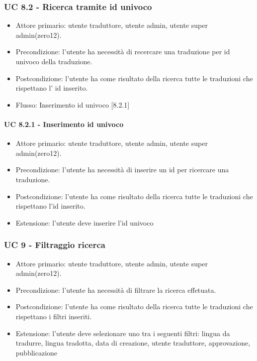     \subsubsection{UC 8.2 - Ricerca tramite id univoco}
        \begin{itemize}
            \item Attore primario: utente traduttore, utente admin, utente super admin(zero12).
            \item Precondizione: l'utente ha necessità di recercare una traduzione per id univoco della traduzione.
            \item Postcondizione: l'utente ha come risultato della ricerca tutte le traduzioni che rispettano l' id inserito.
            \item Flusso: Inserimento id univoco [8.2.1]
        \end{itemize}
        \paragraph{UC 8.2.1 - Inserimento id univoco}
            \begin{itemize}
                \item Attore primario: utente traduttore, utente admin, utente super admin(zero12).
                \item Precondizione: l'utente ha necessità di inserire un id per ricercare una traduzione.
                \item Postcondizione: l'utente ha come risultato della ricerca tutte le traduzioni che rispettano l'id inserito.
                \item Estensione: l'utente deve inserire l'id univoco
            \end{itemize}
\subsubsection{UC 9 - Filtraggio ricerca}
    \begin{itemize}
        \item Attore primario: utente traduttore, utente admin, utente super admin(zero12).
        \item Precondizione: l'utente ha necessità di filtrare la ricerca effetuata.
        \item Postcondizione: l'utente ha come risultato della ricerca tutte le traduzioni che rispettano i filtri inseriti.
        \item Estensione: l'utente deve selezionare uno tra i seguenti filtri: lingua da tradurre, lingua tradotta, data di creazione, utente traduttore, approvazione, pubblicazione
    \end{itemize}
